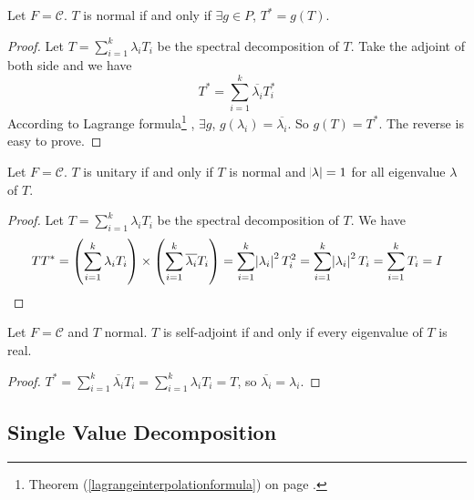 \begin{theorem}
    Let $F=\mathcal{C}$. $T$ is normal if and only if $\exists g \in P$, $T^* = g(T)$.
\end{theorem}
\begin{proof}
    Let $\displaystyle T = \sum_{i=1}^k \lambda_i T_i$ be the spectral decomposition of $T$. Take the adjoint of both side and we have
    \begin{equation}
        T^* = \sum_{i=1}^k \overline{\lambda_i} T_i^*
    \end{equation}
    According to Lagrange formula\footnote{Theorem (\ref{lagrangeinterpolationformula}) on page \pageref{lagrangeinterpolationformula}.} , $\exists g$, $g(\lambda_i) = \overline{\lambda_i}$. So $g(T) = T^*$. The reverse is easy to prove.
\end{proof}

\begin{theorem}
    Let $F=\mathcal{C}$. $T$ is unitary if and only if $T$ is normal and $\abs{\lambda} = 1$ for all eigenvalue $\lambda$ of $T$.
\end{theorem}
\begin{proof}
    Let $\displaystyle T = \sum_{i=1}^k \lambda_i T_i$ be the spectral decomposition of $T$. We have
    \begin{equation*}
    TT^* = \left( \sum_{i=1}^k \lambda_i T_i  \right) \times \left( \sum_{i=1}^k \overline{\lambda_i} T_i \right) = \sum_{i=1}^k \abs{\lambda_i}^2 T_i^2 = \sum_{i=1}^k \abs{\lambda_i}^2 T_i = \sum_{i=1}^k T_i  = I    
    \end{equation*}
\end{proof}


\begin{theorem}
    Let $F=\mathcal{C}$ and $T$ normal. $T$ is self-adjoint if and only if every eigenvalue of $T$ is real.    
\end{theorem}
\begin{proof}
    $\displaystyle T^* = \sum_{i=1}^k \overline{\lambda_i} T_i = \sum_{i=1}^k \lambda_i T_i = T$, so $\overline{\lambda_i} = \lambda_i$.
\end{proof}



\subsection{Single Value Decomposition}

